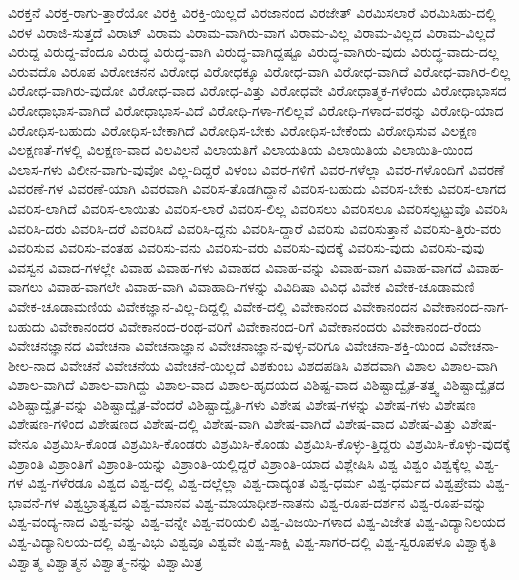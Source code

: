 {ವಿರಕ್ತನೆ
ವಿರಕ್ತ-ರಾಗು-ತ್ತಾರೆಯೋ
ವಿರಕ್ತಿ
ವಿರಕ್ತಿ-ಯಿಲ್ಲದೆ
ವಿರಜಾನಂದ
ವಿರಜೇತ್
ವಿರಮಿಸಲಾರೆ
ವಿರಮಿಸಿಹು-ದಲ್ಲಿ
ವಿರಳ
ವಿರಾಜಿ-ಸುತ್ತದೆ
ವಿರಾಟ್
ವಿರಾಮ
ವಿರಾಮ-ವಾಗಿರು-ವಾಗ
ವಿರಾಮ-ವಿಲ್ಲ
ವಿರಾಮ-ವಿಲ್ಲದ
ವಿರಾಮ-ವಿಲ್ಲದೆ
ವಿರುದ್ದ
ವಿರುದ್ದ-ವೆಂದೂ
ವಿರುದ್ಧ
ವಿರುದ್ಧ-ವಾಗಿ
ವಿರುದ್ಧ-ವಾಗಿದ್ದಷ್ಟೂ
ವಿರುದ್ಧ-ವಾಗಿರು-ವುದು
ವಿರುದ್ಧ-ವಾದು-ದಲ್ಲ
ವಿರುವದೊ
ವಿರೂಪ
ವಿರೋಚನನ
ವಿರೋಧ
ವಿರೋಧಕ್ಕೂ
ವಿರೋಧ-ವಾಗಿ
ವಿರೋಧ-ವಾಗಿದೆ
ವಿರೋಧ-ವಾಗಿರ-ಲಿಲ್ಲ
ವಿರೋಧ-ವಾಗಿರು-ವುದೋ
ವಿರೋಧ-ವಾದ
ವಿರೋಧ-ವಿತ್ತು
ವಿರೋಧವೇ
ವಿರೋಧಾತ್ಮಕ-ಗಳೆಂದು
ವಿರೋಧಾಭಾಸದ
ವಿರೋಧಾಭಾಸ-ವಾಗಿದೆ
ವಿರೋಧಾಭಾಸ-ವಿದೆ
ವಿರೋಧಿ-ಗಳಾ-ಗಲಿಲ್ಲವೆ
ವಿರೋಧಿ-ಗಳಾದ-ವರನ್ನು
ವಿರೋಧಿ-ಯಾದ
ವಿರೋಧಿಸ-ಬಹುದು
ವಿರೋಧಿಸ-ಬೇಕಾಗಿದೆ
ವಿರೋಧಿಸ-ಬೇಕು
ವಿರೋಧಿಸ-ಬೇಕೆಂದು
ವಿರೋಧಿಸುವ
ವಿಲಕ್ಷಣ
ವಿಲಕ್ಷಣತೆ-ಗಳಲ್ಲಿ
ವಿಲಕ್ಷಣ-ವಾದ
ವಿಲವಿಲನೆ
ವಿಲಾಯತಿಗೆ
ವಿಲಾಯತಿಯ
ವಿಲಾಯಿತಿಯ
ವಿಲಾಯಿತಿ-ಯಿಂದ
ವಿಲಾಸ-ಗಳು
ವಿಲೀನ-ವಾಗು-ವುವೋ
ವಿಲ್ಲ-ದಿದ್ದರೆ
ವಿಳಂಬ
ವಿವರ-ಗಳಿಗೆ
ವಿವರ-ಗಳೆಲ್ಲಾ
ವಿವರ-ಗಳೊಂದಿಗೆ
ವಿವರಣೆ
ವಿವರಣೆ-ಗಳ
ವಿವರಣೆ-ಯಾಗಿ
ವಿವರವಾಗಿ
ವಿವರಿಸ-ತೊಡಗಿದ್ದಾನೆ
ವಿವರಿಸ-ಬಹುದು
ವಿವರಿಸ-ಬೇಕು
ವಿವರಿಸ-ಲಾಗದ
ವಿವರಿಸ-ಲಾಗಿದೆ
ವಿವರಿಸ-ಲಾಯಿತು
ವಿವರಿಸ-ಲಾರೆ
ವಿವರಿಸ-ಲಿಲ್ಲ
ವಿವರಿಸಲು
ವಿವರಿಸಲೂ
ವಿವರಿಸಲ್ಪಟ್ಟುವೊ
ವಿವರಿಸಿ
ವಿವರಿಸಿ-ದರು
ವಿವರಿಸಿ-ದರೆ
ವಿವರಿಸಿದೆ
ವಿವರಿಸಿ-ದ್ದನು
ವಿವರಿಸಿ-ದ್ದಾರೆ
ವಿವರಿಸು
ವಿವರಿಸುತ್ತಾನೆ
ವಿವರಿಸು-ತ್ತಿರು-ವರು
ವಿವರಿಸುವ
ವಿವರಿಸು-ವಂತಹ
ವಿವರಿಸು-ವನು
ವಿವರಿಸು-ವರು
ವಿವರಿಸು-ವುದಕ್ಕೆ
ವಿವರಿಸು-ವುದು
ವಿವರಿಸು-ವುವು
ವಿವಸ್ವನ
ವಿವಾದ-ಗಳಲ್ಲೇ
ವಿವಾಹ
ವಿವಾಹ-ಗಳು
ವಿವಾಹದ
ವಿವಾಹ-ವನ್ನು
ವಿವಾಹ-ವಾಗ
ವಿವಾಹ-ವಾಗದೆ
ವಿವಾಹ-ವಾಗಲು
ವಿವಾಹ-ವಾಗಲೇ
ವಿವಾಹ-ವಾಗಿ
ವಿವಾಹಾದಿ-ಗಳನ್ನು
ವಿವಿದಿಷಾ
ವಿವಿಧ
ವಿವೇಕ
ವಿವೇಕ-ಚೂಡಾಮಣಿ
ವಿವೇಕ-ಚೂಡಾಮಣಿಯ
ವಿವೇಕಜ್ಞಾನ-ವಿಲ್ಲ-ದಿದ್ದಲ್ಲಿ
ವಿವೇಕ-ದಲ್ಲಿ
ವಿವೇಕಾನಂದ
ವಿವೇಕಾನಂದನ
ವಿವೇಕಾನಂದ-ನಾಗ-ಬಹುದು
ವಿವೇಕಾನಂದರ
ವಿವೇಕಾನಂದ-ರಂಥ-ವರಿಗೆ
ವಿವೇಕಾನಂದ-ರಿಗೆ
ವಿವೇಕಾನಂದರು
ವಿವೇಕಾನಂದ-ರೆಂದು
ವಿವೇಚನಜ್ಞಾನದ
ವಿವೇಚನಾ
ವಿವೇಚನಾಜ್ಞಾನ
ವಿವೇಚನಾಜ್ಞಾನ-ವುಳ್ಳ-ವರಿಗೂ
ವಿವೇಚನಾ-ಶಕ್ತಿ-ಯಿಂದ
ವಿವೇಚನಾ-ಶೀಲ-ನಾದ
ವಿವೇಚನೆ
ವಿವೇಚನೆಯ
ವಿವೇಚನೆ-ಯಿಲ್ಲದೆ
ವಿಶಕುಂಬ
ವಿಶದಪಡಿಸಿ
ವಿಶದವಾಗಿ
ವಿಶಾಲ
ವಿಶಾಲ-ವಾಗಿ
ವಿಶಾಲ-ವಾಗಿದೆ
ವಿಶಾಲ-ವಾಗಿದ್ದು
ವಿಶಾಲ-ವಾದ
ವಿಶಾಲ-ಹೃದಯದ
ವಿಶಿಷ್ಟ-ವಾದ
ವಿಶಿಷ್ಟಾದ್ವೈತ-ತತ್ತ್ವ
ವಿಶಿಷ್ಟಾದ್ವೈತದ
ವಿಶಿಷ್ಟಾದ್ವೈತ-ವನ್ನು
ವಿಶಿಷ್ಟಾದ್ವೈತ-ವೆಂದರೆ
ವಿಶಿಷ್ಟಾದ್ವೈತಿ-ಗಳು
ವಿಶೇಷ
ವಿಶೇಷ-ಗಳನ್ನು
ವಿಶೇಷ-ಗಳು
ವಿಶೇಷಣ
ವಿಶೇಷಣ-ಗಳಿಂದ
ವಿಶೇಷಣದ
ವಿಶೇಷ-ದಲ್ಲಿ
ವಿಶೇಷ-ವಾಗಿ
ವಿಶೇಷ-ವಾಗಿದೆ
ವಿಶೇಷ-ವಾದ
ವಿಶೇಷ-ವಿತ್ತು
ವಿಶೇಷ-ವೇನೂ
ವಿಶ್ರಮಿಸಿ-ಕೊಂಡ
ವಿಶ್ರಮಿಸಿ-ಕೊಂಡರು
ವಿಶ್ರಮಿಸಿ-ಕೊಂಡು
ವಿಶ್ರಮಿಸಿ-ಕೊಳ್ಳು-ತ್ತಿದ್ದರು
ವಿಶ್ರಮಿಸಿ-ಕೊಳ್ಳು-ವುದಕ್ಕೆ
ವಿಶ್ರಾಂತಿ
ವಿಶ್ರಾಂತಿಗೆ
ವಿಶ್ರಾಂತಿ-ಯನ್ನು
ವಿಶ್ರಾಂತಿ-ಯಲ್ಲಿದ್ದರೆ
ವಿಶ್ರಾಂತಿ-ಯಾದ
ವಿಶ್ಲೇಷಿಸಿ
ವಿಶ್ವ
ವಿಶ್ವಂ
ವಿಶ್ವಕ್ಕೆಲ್ಲ
ವಿಶ್ವ-ಗಳ
ವಿಶ್ವ-ಗಳೆರಡೂ
ವಿಶ್ವದ
ವಿಶ್ವ-ದಲ್ಲಿ
ವಿಶ್ವ-ದಲ್ಲೆಲ್ಲಾ
ವಿಶ್ವ-ದಾದ್ಯಂತ
ವಿಶ್ವ-ಧರ್ಮ
ವಿಶ್ವ-ಧರ್ಮದ
ವಿಶ್ವಪ್ರೇಮ
ವಿಶ್ವ-ಭಾವನೆ-ಗಳ
ವಿಶ್ವಭ್ರಾತೃತ್ವದ
ವಿಶ್ವ-ಮಾನವ
ವಿಶ್ವ-ಮಾಯಾಧೀಶ-ನಾತನು
ವಿಶ್ವ-ರೂಪ-ದರ್ಶನ
ವಿಶ್ವ-ರೂಪ-ವನ್ನು
ವಿಶ್ವ-ವಂದ್ಯ-ನಾದ
ವಿಶ್ವ-ವನ್ನು
ವಿಶ್ವ-ವನ್ನೇ
ವಿಶ್ವ-ವರಿಯಲಿ
ವಿಶ್ವ-ವಿಜಯಿ-ಗಳಾದ
ವಿಶ್ವ-ವಿಜೇತ
ವಿಶ್ವ-ವಿದ್ಯಾನಿಲಯದ
ವಿಶ್ವ-ವಿದ್ಯಾನಿಲಯ-ದಲ್ಲಿ
ವಿಶ್ವ-ವಿಭು
ವಿಶ್ವವೂ
ವಿಶ್ವವೇ
ವಿಶ್ವ-ಸಾಕ್ಷಿ
ವಿಶ್ವ-ಸಾಗರ-ದಲ್ಲಿ
ವಿಶ್ವ-ಸ್ವರೂಪಳೂ
ವಿಶ್ವಾಕೃತಿ
ವಿಶ್ವಾತ್ಮ
ವಿಶ್ವಾತ್ಮನ
ವಿಶ್ವಾತ್ಮ-ನನ್ನು
ವಿಶ್ವಾಮಿತ್ರ
}
